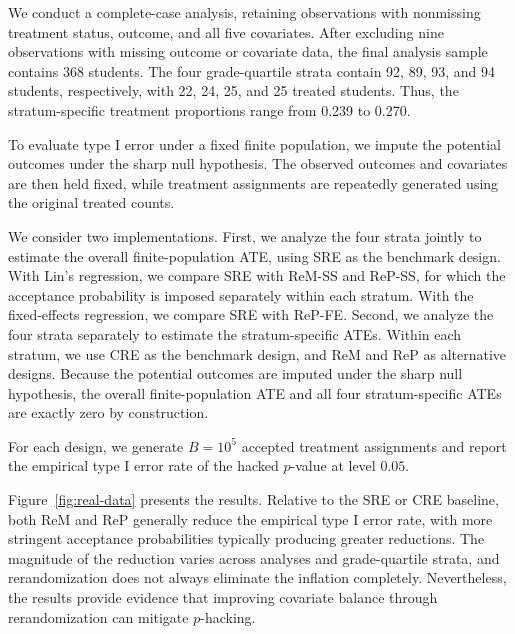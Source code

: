 \documentclass[12pt]{article}
\begin{document}
We conduct a complete-case analysis, retaining observations with
nonmissing treatment status, outcome, and all five covariates. After
excluding nine observations with missing outcome or covariate data, the
final analysis sample contains 368 students. The four grade-quartile strata
contain 92, 89, 93, and 94 students, respectively, with 22, 24, 25, and
25 treated students. Thus, the stratum-specific treatment proportions
range from 0.239 to 0.270. 

To evaluate type I error under a fixed finite population, we impute the
potential outcomes under the sharp null hypothesis.
The observed outcomes and covariates are then held fixed, while treatment
assignments are repeatedly generated using the original treated counts.

We consider two implementations. First, we analyze the four strata
jointly to estimate the overall finite-population ATE, using SRE as the
benchmark design. With Lin's regression, we compare
SRE with ReM-SS and ReP-SS, for which the acceptance probability is imposed
separately within each stratum. With the fixed-effects
regression, we compare SRE with ReP-FE.
Second, we analyze the four strata separately to estimate the
stratum-specific ATEs. Within each stratum, we use CRE as the benchmark
design, and ReM and ReP as alternative designs. Because
the potential outcomes are imputed under the sharp null hypothesis,
the overall finite-population ATE and all four stratum-specific ATEs are
exactly zero by construction.

 For each design, we generate
$B=10^5$ accepted treatment assignments and report the empirical
type I error rate of the hacked $p$-value at level $0.05$.

Figure~\ref{fig:real-data} presents the results. Relative to the SRE or
CRE baseline, both ReM and ReP generally reduce the empirical type I
error rate, with more stringent acceptance probabilities typically
producing greater reductions. The magnitude of the reduction varies
across analyses and grade-quartile strata, and rerandomization does not
always eliminate the inflation completely. Nevertheless, the results
provide evidence that improving covariate balance through
rerandomization can mitigate $p$-hacking.
\end{document}
